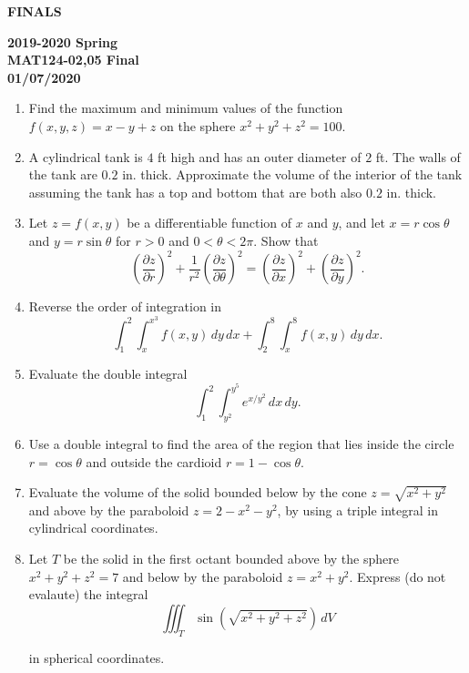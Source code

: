 \documentclass[a4paper, 12pt]{article}
\begin{document}

\newpage
\vspace*{\fill}
\begin{center}
{}
\Huge \textbf{FINALS}
\end{center}
\vspace*{\fill}

\newpage
{}
{}

\begin{center}
\textbf{2019-2020 Spring \\MAT124-02,05 Final\\01/07/2020}
\end{center}

\begin{enumerate}[leftmargin=*,label=\textbf{\arabic*.}]
\item Find the maximum and minimum values of the function $f(x,y,z)=x-y+z$ on the sphere $x^2+y^2+z^2=100$.

\item A cylindrical tank is $4$ ft high and has an outer diameter of $2$ ft. The walls of the tank are $0.2$ in. thick. Approximate the volume of the interior of the tank assuming the tank has a top and bottom that are both also $0.2$ in. thick.

\item Let $z=f(x,y)$ be a differentiable function of $x$ and $y$, and let $x=r\cos\theta$ and $y=r\sin\theta$ for $r>0$ and $0<\theta<2\pi$. Show that
\[\left(\frac{\partial z}{\partial r}\right)^2+\frac1{r^2}\left(\frac{\partial z}{\partial\theta}\right)^2=\left(\frac{\partial z}{\partial x}\right)^2+\left(\frac{\partial z}{\partial y}\right)^2.\]

\item Reverse the order of integration in
\[\displaystyle\int_1^2\int_x^{x^3}f(x,y)\,dy\,dx+\int_2^8\int_x^8f(x,y)\,dy\,dx.\]

\item Evaluate the double integral
\[\int_1^2\int_{y^2}^{y^5}{e}^{x/y^2}\,dx\,dy.\]

\item Use a double integral to find the area of the region that lies inside the circle $r=\cos\theta$ and outside the cardioid $r=1-\cos\theta$.

\item Evaluate the volume of the solid bounded below by the cone $z=\sqrt{x^2+y^2}$ and above by the paraboloid $z=2-x^2-y^2$, by using a triple integral in cylindrical coordinates.

\item Let $T$ be the solid in the first octant bounded above by the sphere $x^2+y^2+z^2=7$ and below by the paraboloid $z=x^2+y^2$. Express (do not evalaute) the integral
\[\iiint_T\sin\left(\sqrt{x^2+y^2+z^2}\right)\,dV\]

in spherical coordinates.
\end{enumerate}
\end{document}
